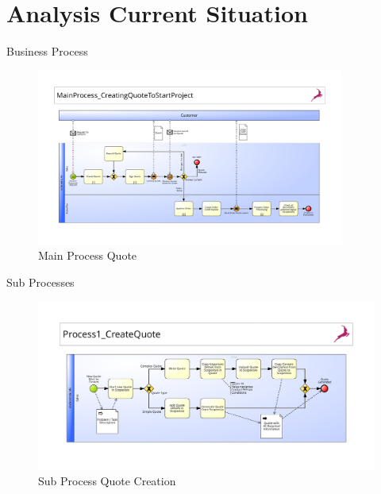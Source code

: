 \documentclass[utf8, xcolor, usenames,dvipsnames, aspectratio=169]{beamer}
\begin{document}
\section{Analysis Current Situation}
\begin{frame}{Business Process}
	\begin{figure}[t]
		\centering
		\includegraphics[width=0.9\textwidth, height=0.85\textheight]{./images/0_main}
		\caption{Main Process Quote}
	\end{figure}
\end{frame}

\begin{frame}{Sub Processes}
	\begin{figure}[t]
		\centering
		\includegraphics[height=0.9\textheight]{./images/0-1_createQuote}
		\caption{Sub Process Quote Creation}
	\end{figure}
\end{frame}
\end{document}
